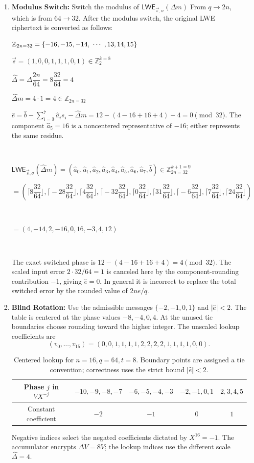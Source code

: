 \begin{enumerate}
\item \textbf{Modulus Switch:} Switch the modulus of $\textsf{LWE}_{\vec{s}, \sigma}(\Delta m)$ From $q \rightarrow 2n$, which is from $64 \rightarrow 32$. After the modulus switch, the original LWE ciphertext is converted as follows:

$\mathbb{Z}_{2n=32} = \{-16, -15, -14, \text{ } \text{$\cdots$} \text{ }, 13, 14, 15\}$

$\vec{s} = (1, 0, 0, 1, 1, 1, 0, 1) \in \mathbb{Z}_2^{k=8}$


$\hat{\Delta} = \Delta\dfrac{2n}{64} = 8\dfrac{32}{64} = 4$

$\hat{\Delta}m = 4 \cdot 1 = 4 \in \mathbb{Z}_{2n=32}$

$\hat e=\hat b-\sum_{i=0}^{7}\hat a_i s_i-\hat\Delta m=12-(4-16+16+4)-4=0\pmod{32}$. The component $\hat a_5=16$ is a noncentered representative of $-16$; either represents the same residue.

$ $

$\textsf{LWE}_{\vec{s}, \sigma}(\hat{\Delta}m) = (\hat{a}_0, \hat{a}_1, \hat{a}_2, \hat{a}_3, \hat{a}_4, \hat{a}_5, \hat{a}_6, \hat{a}_7, \hat{b}) \in \mathbb{Z}_{2n=32}^{k+1=9}$


$ = (\Big\lceil 8\dfrac{32}{64} \Big\rfloor, \Big\lceil -28\dfrac{32}{64}\Big\rfloor, \Big\lceil 4\dfrac{32}{64}\Big\rfloor, \Big\lceil -32\dfrac{32}{64}\Big\rfloor, \Big\lceil 0\dfrac{32}{64}\Big\rfloor, \Big\lceil 31\dfrac{32}{64}\Big\rfloor, \Big\lceil -6\dfrac{32}{64}\Big\rfloor, \Big\lceil 7\dfrac{32}{64}\Big\rfloor, \Big\lceil 24\dfrac{32}{64}\Big\rfloor)$

$ $

$= (4, {-14}, 2, -16, 0, 16, {-3}, 4, 12)$

$ $

The exact switched phase is $12-(4-16+16+4)=4\pmod{32}$. The scaled input error $2\cdot32/64=1$ is canceled here by the component-rounding contribution $-1$, giving $\hat e=0$. In general it is incorrect to replace the total switched error by the rounded value of $2ne/q$.

\item \textbf{Blind Rotation:} Use the admissible messages $\{-2,-1,0,1\}$ and $|\hat e|<2$. The table is centered at the phase values $-8,-4,0,4$. At the unused tie boundaries choose rounding toward the higher integer. The unscaled lookup coefficients are
\[
(v_0,\ldots,v_{15})=(0,0,1,1,1,1,2,2,2,2,1,1,1,1,0,0).
\]
\begin{table}[h]
\centering
\begin{tabular}{c|c|c|c|c}
\hline
Phase $j$ in $V X^{-j}$ & $-10,-9,-8,-7$ & $-6,-5,-4,-3$ & $-2,-1,0,1$ & $2,3,4,5$\\
\hline
Constant coefficient & $-2$ & $-1$ & $0$ & $1$\\
\hline
\end{tabular}
\caption{Centered lookup for $n=16,q=64,t=8$. Boundary points are assigned a tie convention; correctness uses the strict bound $|\hat e|<2$.}
\label{tab:lut}
\end{table}
Negative indices select the negated coefficients dictated by $X^{16}=-1$. The accumulator encrypts $\Delta V=8V$; the lookup indices use the different scale $\hat\Delta=4$.


\end{enumerate}
